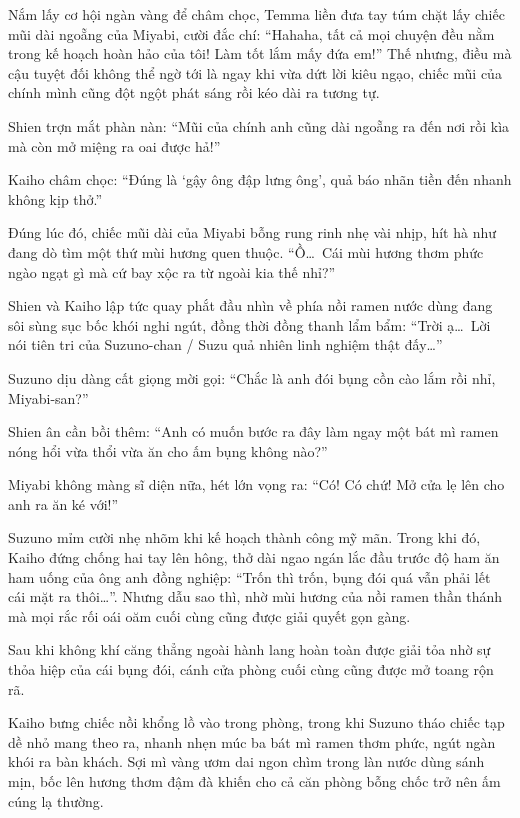 \documentclass[../main.tex]{subfiles}
\begin{document}
Nắm lấy cơ hội ngàn vàng để châm chọc, Temma liền đưa tay túm chặt lấy chiếc mũi dài ngoẵng của Miyabi, cười đắc chí: ``Hahaha, tất cả mọi chuyện đều nằm trong kế hoạch hoàn hảo của tôi! Làm tốt lắm mấy đứa em!'' Thế nhưng, điều mà cậu tuyệt đối không thể ngờ tới là ngay khi vừa dứt lời kiêu ngạo, chiếc mũi của chính mình cũng đột ngột phát sáng rồi kéo dài ra tương tự.


Shien trợn mắt phàn nàn: ``Mũi của chính anh cũng dài ngoẵng ra đến nơi rồi kìa mà còn mở miệng ra oai được hả!''

Kaiho châm chọc: ``Đúng là `gậy ông đập lưng ông', quả báo nhãn tiền đến nhanh không kịp thở.''

Đúng lúc đó, chiếc mũi dài của Miyabi bỗng rung rinh nhẹ vài nhịp, hít hà như đang dò tìm một thứ mùi hương quen thuộc. ``Ồ\dots\ Cái mùi hương thơm phức ngào ngạt gì mà cứ bay xộc ra từ ngoài kia thế nhỉ?''

Shien và Kaiho lập tức quay phắt đầu nhìn về phía nồi ramen nước dùng đang sôi sùng sục bốc khói nghi ngút, đồng thời đồng thanh lẩm bẩm: ``Trời ạ\dots\ Lời nói tiên tri của Suzuno-chan / Suzu quả nhiên linh nghiệm thật đấy\dots''

Suzuno dịu dàng cất giọng mời gọi: ``Chắc là anh đói bụng cồn cào lắm rồi nhỉ, Miyabi-san?''

Shien ân cần bồi thêm: ``Anh có muốn bước ra đây làm ngay một bát mì ramen nóng hổi vừa thổi vừa ăn cho ấm bụng không nào?''

Miyabi không màng sĩ diện nữa, hét lớn vọng ra: ``Có! Có chứ! Mở cửa lẹ lên cho anh ra ăn ké với!''

Suzuno mỉm cười nhẹ nhõm khi kế hoạch thành công mỹ mãn. Trong khi đó, Kaiho đứng chống hai tay lên hông, thở dài ngao ngán lắc đầu trước độ ham ăn ham uống của ông anh đồng nghiệp: ``Trốn thì trốn, bụng đói quá vẫn phải lết cái mặt ra thôi\dots''. Nhưng dẫu sao thì, nhờ mùi hương của nồi ramen thần thánh mà mọi rắc rối oái oăm cuối cùng cũng được giải quyết gọn gàng.
\omk

Sau khi không khí căng thẳng ngoài hành lang hoàn toàn được giải tỏa nhờ sự thỏa hiệp của cái bụng đói, cánh cửa phòng cuối cùng cũng được mở toang rộn rã.

Kaiho bưng chiếc nồi khổng lồ vào trong phòng, trong khi Suzuno tháo chiếc tạp dề nhỏ mang theo ra, nhanh nhẹn múc ba bát mì ramen thơm phức, ngút ngàn khói ra bàn khách. Sợi mì vàng ươm dai ngon chìm trong làn nước dùng sánh mịn, bốc lên hương thơm đậm đà khiến cho cả căn phòng bỗng chốc trở nên ấm cúng lạ thường.
\end{document}
